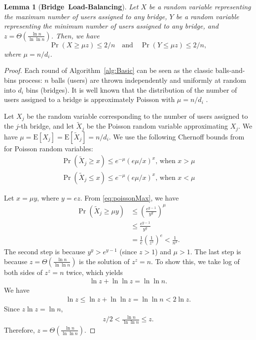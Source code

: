 \documentclass[letterpaper,twocolumn,10pt]{article}
\newcommand{\E}{\mathbf{\mathrm{E}}}
\newtheorem{lemma}{Lemma}
\newcommand{\sfsize}{\fontsize{0.73\baselineskip}{0.73\baselineskip}\selectfont}
\newcommand{\sans}[1]{\textsf{\sfsize \mbox{#1}}}
\newcommand{\sansb}[1]{\textbf{\sans{\mbox{#1}}}}
\begin{document}
\begin{lemma}[\sansb{Bridge Load-Balancing}]
	Let $X$ be a random variable representing the maximum number of users assigned to any bridge, $Y$ be a random variable representing the minimum number of users assigned to any bridge, and $z = \Theta\left(\frac{\ln{n}}{\ln{\ln{n}}}\right)$. Then, we have 
	\[
	\Pr\left(X \geq \mu z\right) \leq 2/n \quad \text{and} \quad 
	\Pr\left(Y \leq \mu z\right) \leq 2/n,
	\]
	where ${\mu = n/d_i}$.
\end{lemma}
\begin{proof}
	Each round of Algorithm~\ref{alg:Basic} can be seen as the classic balls-and-bins process: $n$ balls (users) are thrown independently and uniformly at random into $d_i$ bins (bridges). It is well known that the distribution of the number of users assigned to a bridge is approximately Poisson with ${\mu = n/d_i}$ \cite[Chapter~5]{Michael2005}.
	
	Let $X_j$ be the random variable corresponding to the number of users assigned to the $j$-th bridge, and let $\tilde{X}_j$ be the Poisson random variable approximating $X_j$. We have ${\mu = \E[X_j] = \E[\tilde{X}_j] = n/d_i}$. We use the following Chernoff bounds from \cite[Chapter~5]{Michael2005} for Poisson random variables:
	\begin{align}
	\Pr(\tilde{X}_j \geq x) \leq e^{-\mu}(e\mu/x)^x \text{, when } x > \mu \label{eq:poissonMax}\\
	\Pr(\tilde{X}_j \leq x) \leq e^{-\mu}(e\mu/x)^x \text{, when } x < \mu \label{eq:poissonMin}
	\end{align}
	
	\noindent Let ${x = \mu y}$, where ${y = ez}$. From \eqref{eq:poissonMax}, we have
	\begin{align}
	\Pr(\tilde{X}_j \geq \mu y) &\leq \left(\frac{e^{y-1}}{y^y}\right)^\mu \nonumber \\
	&\leq \frac{e^{y-1}}{y^y} \nonumber \\ 
	&= \frac{1}{e}\left(\frac{1}{z^z}\right)^e < \frac{1}{n^2}. \label{eq:approxBound}
	\end{align}
	The second step is because ${y^y > e^{y-1}}$ (since ${z > 1}$) and ${\mu > 1}$. The last step is because ${z = \Theta\left(\frac{\ln{n}}{\ln{\ln{n}}}\right)}$ is the solution of ${z^z = n}$. To show this, we take log of both sides of ${z^z = n}$ twice, which yields
	\begin{align*}
	\ln{z} + \ln{\ln{z}} = \ln{\ln{n}}.
	\end{align*}
	We have
	\begin{align*}
	\ln{z} \leq \ln{z} + \ln{\ln{z}} = \ln{\ln{n}} < 2\ln{z}.
	\end{align*}
	Since $z\ln{z} = \ln{n}$,
	\begin{align*}
	z/2 < \frac{\ln{n}}{\ln{\ln{n}}} \leq z.
	\end{align*}
	Therefore, $z = \Theta\left(\frac{\ln{n}}{\ln{\ln{n}}}\right)$. 
	

\end{proof}
\end{document}
